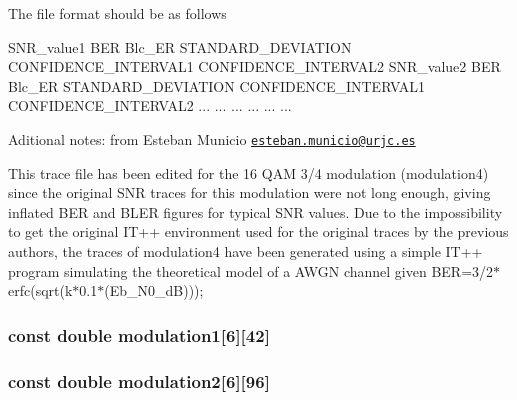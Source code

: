 The file format should be as follows

S\+N\+R\+\_\+value1 B\+ER Blc\+\_\+\+ER S\+T\+A\+N\+D\+A\+R\+D\+\_\+\+D\+E\+V\+I\+A\+T\+I\+ON C\+O\+N\+F\+I\+D\+E\+N\+C\+E\+\_\+\+I\+N\+T\+E\+R\+V\+A\+L1 C\+O\+N\+F\+I\+D\+E\+N\+C\+E\+\_\+\+I\+N\+T\+E\+R\+V\+A\+L2 S\+N\+R\+\_\+value2 B\+ER Blc\+\_\+\+ER S\+T\+A\+N\+D\+A\+R\+D\+\_\+\+D\+E\+V\+I\+A\+T\+I\+ON C\+O\+N\+F\+I\+D\+E\+N\+C\+E\+\_\+\+I\+N\+T\+E\+R\+V\+A\+L1 C\+O\+N\+F\+I\+D\+E\+N\+C\+E\+\_\+\+I\+N\+T\+E\+R\+V\+A\+L2 ... ... ... ... ... ...

Aditional notes\+: from Esteban Municio \href{mailto:esteban.municio@urjc.es}{\tt esteban.\+municio@urjc.\+es}

This trace file has been edited for the 16 Q\+AM 3/4 modulation (modulation4) since the original S\+NR traces for this modulation were not long enough, giving inflated B\+ER and B\+L\+ER figures for typical S\+NR values. Due to the impossibility to get the original I\+T++ environment used for the original traces by the previous authors, the traces of modulation4 have been generated using a simple I\+T++ program simulating the theoretical model of a A\+W\+GN channel given B\+ER=3/2$\ast$erfc(sqrt(k$\ast$0.1$\ast$(Eb\+\_\+\+N0\+\_\+dB))); 
\subsubsection[{\texorpdfstring{modulation1}{modulation1}}]{\setlength{\rightskip}{0pt plus 5cm}const double modulation1\mbox{[}6\mbox{]}\mbox{[}42\mbox{]}\hspace{0.3cm}{\ttfamily [related]}}\hypertarget{classns3_1_1SNRToBlockErrorRateManager_a748cc86d24982cdcab55497c0813d249}{}\label{classns3_1_1SNRToBlockErrorRateManager_a748cc86d24982cdcab55497c0813d249}
\subsubsection[{\texorpdfstring{modulation2}{modulation2}}]{\setlength{\rightskip}{0pt plus 5cm}const double modulation2\mbox{[}6\mbox{]}\mbox{[}96\mbox{]}\hspace{0.3cm}{\ttfamily [related]}}\hypertarget{classns3_1_1SNRToBlockErrorRateManager_adcc1f71f0e96746552c6d3269dc1889a}{}\label{classns3_1_1SNRToBlockErrorRateManager_adcc1f71f0e96746552c6d3269dc1889a}
